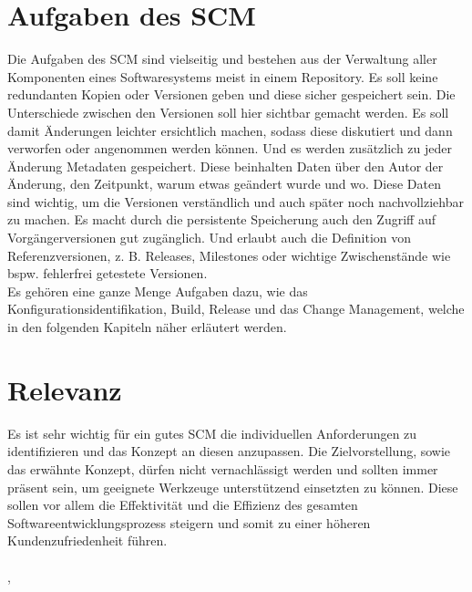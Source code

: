 \section{Aufgaben des SCM}
Die Aufgaben des \acs{SCM} sind vielseitig und bestehen aus der Verwaltung aller Komponenten eines Softwaresystems meist in einem Repository. Es soll keine redundanten Kopien oder Versionen geben und diese sicher gespeichert sein. Die Unterschiede zwischen den Versionen soll hier sichtbar gemacht werden. Es soll damit Änderungen leichter ersichtlich machen, sodass diese diskutiert und dann verworfen oder angenommen werden können. Und es werden zusätzlich zu jeder Änderung Metadaten gespeichert. Diese beinhalten Daten über den Autor der Änderung, den Zeitpunkt, warum etwas geändert wurde und wo. Diese Daten sind wichtig, um die Versionen verständlich und auch später noch nachvollziehbar zu machen. Es macht durch die persistente Speicherung auch den Zugriff auf Vorgängerversionen gut zugänglich. Und erlaubt auch die Definition von Referenzversionen, \acs{z. B.} Releases, Milestones oder wichtige Zwischenstände wie bspw. fehlerfrei getestete Versionen.
\\
Es gehören eine ganze Menge Aufgaben dazu, wie das Konfigurationsidentifikation, Build, Release und das Change Management, welche in den folgenden Kapiteln näher erläutert werden.
\cite{scm-unibonn}
\section{Relevanz}
Es ist sehr wichtig für ein gutes \acs{SCM} die individuellen Anforderungen zu identifizieren und das Konzept an diesen anzupassen. Die Zielvorstellung, sowie das erwähnte Konzept, dürfen nicht vernachlässigt werden und sollten immer präsent sein, um geeignete Werkzeuge unterstützend einsetzten zu können. Diese sollen vor allem die Effektivität und die Effizienz des gesamten Softwareentwicklungsprozess steigern und somit zu einer höheren Kundenzufriedenheit führen.
\\\\
\cite{scm-agil}, \cite{scm-pearson}